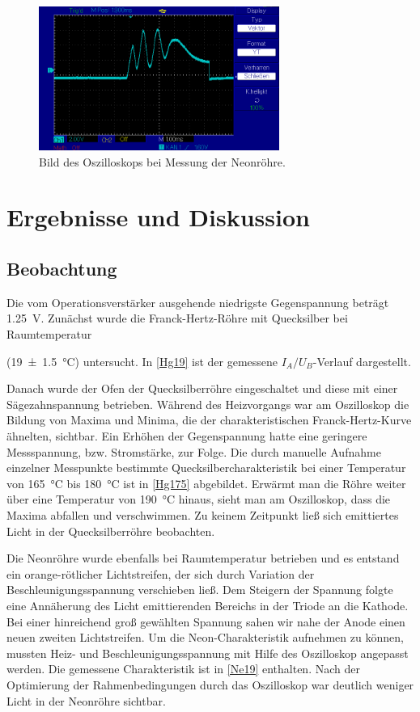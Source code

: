 \documentclass[
	a4paper,
	12pt,
	pagesize,
	ngerman
]{scrartcl}
\begin{document}
	\begin{figure}[H]
		\includegraphics[width=0.7\textwidth]{oszi}
		\centering
		\caption{Bild des Oszilloskops bei Messung der Neonröhre.}
		\label{oszi}
		\centering
	\end{figure}

	\section{Ergebnisse und Diskussion}
	

	\subsection{Beobachtung}
	Die vom Operationsverstärker ausgehende niedrigste Gegenspannung beträgt \SI{1,25}{V}. 
	Zunächst wurde die Franck-Hertz-Röhre mit Quecksilber bei Raumtemperatur
	
	\noindent 
	(\SI{19 +- 1,5}{\degreeCelsius}) untersucht. In \cref{Hg19} ist der gemessene $I_A/U_B$-Verlauf dargestellt.
	
	Danach wurde der Ofen der Quecksilberröhre eingeschaltet und diese mit einer Sägezahnspannung betrieben. %
	Während des Heizvorgangs war am Oszilloskop die Bildung von Maxima und Minima, die der charakteristischen Franck-Hertz-Kurve ähnelten, sichtbar. %
	Ein Erhöhen der Gegenspannung hatte eine geringere Messspannung, bzw. Stromstärke, zur Folge.
	Die durch manuelle Aufnahme einzelner Messpunkte bestimmte Quecksilbercharakteristik bei einer Temperatur von \SI{165}{\degreeCelsius} bis \SI{180}{\degreeCelsius} ist in \cref{Hg175} abgebildet.
	Erwärmt man die Röhre weiter über eine Temperatur von \SI{190}{\degreeCelsius} hinaus, sieht man am Oszilloskop, dass die Maxima abfallen und verschwimmen.
	Zu keinem Zeitpunkt ließ sich emittiertes Licht in der Quecksilberröhre beobachten.
	
	Die Neonröhre wurde ebenfalls bei Raumtemperatur betrieben und es entstand ein orange-rötlicher Lichtstreifen, der sich durch Variation der Beschleunigungsspannung verschieben ließ. 
	Dem Steigern der Spannung folgte eine Annäherung des Licht emittierenden Bereichs in der Triode an die Kathode.
	Bei einer hinreichend groß gewählten Spannung sahen wir nahe der Anode einen neuen zweiten Lichtstreifen.
	Um die Neon-Charakteristik aufnehmen zu können, mussten Heiz- und Beschleunigungsspannung mit Hilfe des Oszilloskop angepasst werden.
	Die gemessene Charakteristik ist in \cref{Ne19} enthalten. Nach der Optimierung der Rahmenbedingungen durch das Oszilloskop war deutlich weniger Licht in der Neonröhre sichtbar.
	
\end{document}
